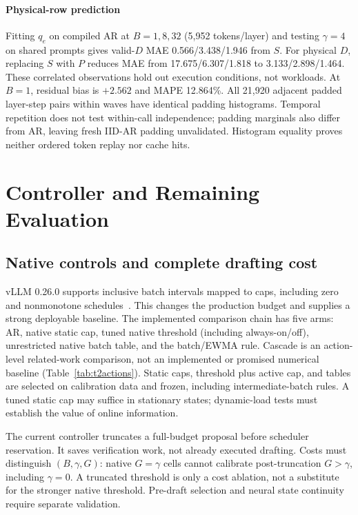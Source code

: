 \documentclass[conference,letterpaper]{IEEEtran}
\begin{document}
\paragraph{Physical-row prediction} Fitting $q_e$ on compiled AR at $B=1,8,32$ (5,952 tokens/layer) and testing $\gamma=4$ on shared prompts gives valid-$D$ MAE 0.566/3.438/1.946 from $S$. For physical $D$, replacing $S$ with $P$ reduces MAE from 17.675/6.307/1.818 to 3.133/2.898/1.464. These correlated observations hold out execution conditions, not workloads. At $B=1$, residual bias is $+2.562$ and MAPE 12.864\%. All 21,920 adjacent padded layer-step pairs within waves have identical padding histograms. Temporal repetition does not test within-call independence; padding marginals also differ from AR, leaving fresh IID-AR padding unvalidated. Histogram equality proves neither ordered token replay nor cache hits.

\section{Controller and Remaining Evaluation}
\subsection{Native controls and complete drafting cost}
vLLM 0.26.0 supports inclusive batch intervals mapped to caps, including zero and nonmonotone schedules~\cite{vllmdynamic,vllmconfig}. This changes the production budget and supplies a strong deployable baseline. The implemented comparison chain has five arms: AR, native static cap, tuned native threshold (including always-on/off), unrestricted native batch table, and the batch/EWMA rule. Cascade is an action-level related-work comparison, not an implemented or promised numerical baseline (Table~\ref{tab:t2actions}). Static caps, threshold plus active cap, and tables are selected on calibration data and frozen, including intermediate-batch rules. A tuned static cap may suffice in stationary states; dynamic-load tests must establish the value of online information.

The current controller truncates a full-budget proposal before scheduler reservation. It saves verification work, not already executed drafting. Costs must distinguish $(B,\gamma,G)$: native $G=\gamma$ cells cannot calibrate post-truncation $G>\gamma$, including $\gamma=0$. A truncated threshold is only a cost ablation, not a substitute for the stronger native threshold. Pre-draft selection and neural state continuity require separate validation.
\end{document}
